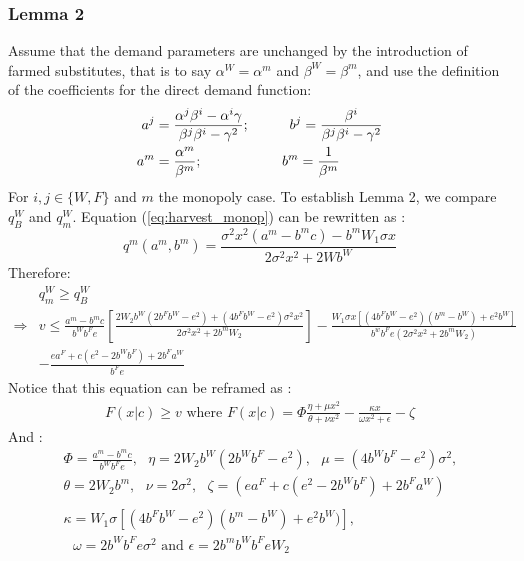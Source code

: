 \subsubsection{Lemma 2}
\label{section:AppendixC}
Assume that the demand parameters are unchanged by the introduction of farmed substitutes, that is to say $\alpha^W  = \alpha ^m$ and $\beta^W= \beta^m$, and use the definition of the coefficients for the direct demand function:
\begin{align*}
 a^{j} &= \frac{\alpha^{j} \beta^{i} - \alpha^{i}\gamma}{\beta^{j} \beta^{i} - \gamma^2}; \hspace*{1cm}
  b^{j} = \frac{\beta^{i}}{\beta^{j} \beta^{i} - \gamma^2}\\
 a^m &= \frac{\alpha^m}{\beta^m}; \hspace*{2cm}
b^m = \frac{1}{\beta^m}
\end{align*}
For $i,j \in \{W, F\}$ and $m$ the monopoly case.
To establish Lemma 2, we compare $q^W_B$ and $q^W_m$. Equation (\ref{eq:harvest_monop}) can be rewritten as : 
$$
q^m(a^m, b^m) = \frac{\sigma^2 x^2(a^m - b^m c) - b^m W_1 \sigma x}{2\sigma^2 x^2 +2Wb^W}
$$
%
Therefore:
\begin{align*}
    &q^W_m \geq q_B^W\\
    \Rightarrow & v \leq \frac{a^m - b^m c}{b^Wb^Fe}\left[ \frac{2 W_2 b^W(2b^Fb^W - e^2) + (4b^Fb^W - e^2)\sigma^2 x^2}{2 \sigma^2 x^2 + 2 b^m W_2}\right]  - \frac{W_1 \sigma x[(4 b^F b^W - e^2)(b^m - b^W) + e^2 b^W]}{b^wb^Fe(2\sigma^2 x^2 + 2b^m W_2)} \\
    & - \frac{ea^F + c(e^2 - 2b^Wb^F) + 2b^F a^W}{b^F e}
\end{align*}
Notice that this equation can be reframed as : 
\begin{align*}
    F(x|c) \geq v \text{ where } F(x|c) = \Phi \frac{\eta + \mu x^2}{\theta + \nu x^2} -\frac{ \kappa x}{\omega x^2 + \epsilon} - \zeta
\end{align*}
And :
\begin{align*}
    &\Phi = \frac{a^m - b^mc}{b^W b^F e},\text{ }
    \eta = 2W_2b^W(2b^Wb^F - e^2),\text{ } 
    \mu = (4b^Wb^F - e^2)\sigma^2,\text{ }\\
    &\theta= 2W_2b^m,\text{ }
    \nu = 2\sigma^2,\text{ }
    \zeta  = (ea^F + c(e^2 - 2b^W b^F) + 2b^F a^W)\\
    \\
    &\kappa = W_1 \sigma [(4b^F b^W - e^2)(b^m - b^W) + e^2 b^W)], \\
    &\text{ }\omega = 2b^Wb^Fe \sigma^2
    \text{ and } \epsilon = 2b^m b^W b^F e W_2
\end{align*}
